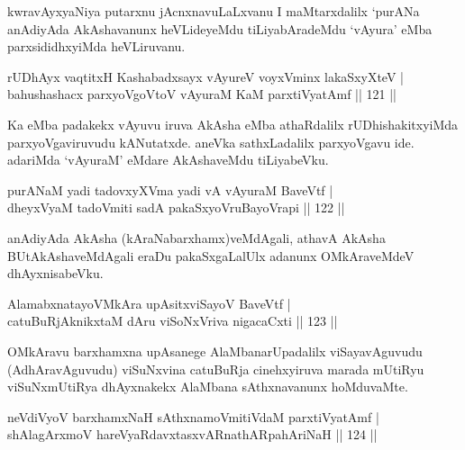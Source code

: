 \begin{artha}
kwravAyxyaNiya putarxnu jAcnxnavuLaLxvanu I maMtarxdalilx `purANa anAdiyAda AkAshavanunx heVLideyeMdu tiLiyabAradeMdu `vAyura' eMba parxsididhxyiMda heVLiruvanu.
\end{artha}


\begin{shl}
rUDhAyx vaqtitxH Kashabadxsayx vAyureV voyxVminx lakaSxyXteV  | \\
bahushashacx parxyoVgoV\s toV vAyuraM KaM parxtiVyatAmf \hfill||  121 ||  
\end{shl}

\begin{artha}
Ka eMba padakekx vAyuvu iruva AkAsha eMba athaRdalilx rUDhishakitxyiMda parxyoVgaviruvudu kANutatxde. aneVka sathxLadalilx parxyoVgavu ide. adariMda `vAyuraM' eMdare AkAshaveMdu tiLiyabeVku.
\end{artha}


\begin{shl}
purANaM yadi tadovxyXVma yadi vA vAyuraM BaveVtf  | \\
dheyxVyaM tadoVmiti sadA pakaSxyoVruBayoVrapi \hfill||  122 ||  
\end{shl}

\begin{artha}
anAdiyAda AkAsha (kAraNabarxhamx)veMdAgali, athavA AkAsha BUtAkAshaveMdAgali eraDu pakaSxgaLalUlx adanunx OMkAraveMdeV dhAyxnisabeVku.
\end{artha}

\begin{shl}
AlamabxnatayoVMkAra upAsitxviSayoV BaveVtf  | \\
catuBuRjAknikxtaM dAru viSoNxVriva nigacaCxti \hfill||  123 ||  
\end{shl}

\begin{artha}
OMkAravu barxhamxna upAsanege AlaMbanarUpadalilx viSayavAguvudu (AdhAravAguvudu) viSuNxvina catuBuRja cinehxyiruva marada mUtiRyu viSuNxmUtiRya dhAyxnakekx AlaMbana sAthxnavanunx hoMduvaMte.
\end{artha}


\begin{shl}
neVdiVyoV barxhamxNaH sAthxnamoVmitiVdaM parxtiVyatAmf  | \\
shAlagArxmoV hareVyaRdavxtasxvARnathARpahAriNaH \hfill||  124 ||  
\end{shl}

